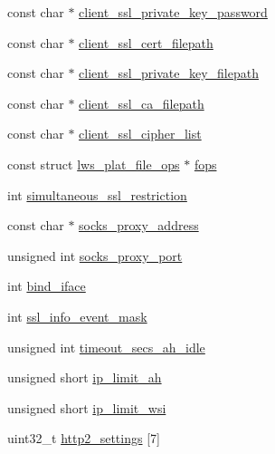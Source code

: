 \begin{DoxyCompactItemize}
\item 
const char $\ast$ \hyperlink{structlws__context__creation__info_a83c709d5dcde2e57b82794b0125208a7}{client\+\_\+ssl\+\_\+private\+\_\+key\+\_\+password}
\item 
const char $\ast$ \hyperlink{structlws__context__creation__info_a3455d3866b9f9f40752ebad440382f50}{client\+\_\+ssl\+\_\+cert\+\_\+filepath}
\item 
const char $\ast$ \hyperlink{structlws__context__creation__info_a7940d8355c16a937d50d271226c3401f}{client\+\_\+ssl\+\_\+private\+\_\+key\+\_\+filepath}
\item 
const char $\ast$ \hyperlink{structlws__context__creation__info_a8e2de485060968e7be1a6f1238d69521}{client\+\_\+ssl\+\_\+ca\+\_\+filepath}
\item 
const char $\ast$ \hyperlink{structlws__context__creation__info_a9302cd766811c49855768c0faf564383}{client\+\_\+ssl\+\_\+cipher\+\_\+list}
\item 
const struct \hyperlink{structlws__plat__file__ops}{lws\+\_\+plat\+\_\+file\+\_\+ops} $\ast$ \hyperlink{structlws__context__creation__info_acf4b535fcf5f638383183e1919969f7c}{fops}
\item 
int \hyperlink{structlws__context__creation__info_a15f4d57af65c2eea7947d518ba8782e2}{simultaneous\+\_\+ssl\+\_\+restriction}
\item 
const char $\ast$ \hyperlink{structlws__context__creation__info_a515032e62576494a69f41971885449cc}{socks\+\_\+proxy\+\_\+address}
\item 
unsigned int \hyperlink{structlws__context__creation__info_ae0f1e3d6c50337d2d93bfbf58c04c934}{socks\+\_\+proxy\+\_\+port}
\item 
int \hyperlink{structlws__context__creation__info_a12b0f0e624463ec02492b009dea7a216}{bind\+\_\+iface}
\item 
int \hyperlink{structlws__context__creation__info_a2d80e89f41b3e195ad36dd1f6fafcb59}{ssl\+\_\+info\+\_\+event\+\_\+mask}
\item 
unsigned int \hyperlink{structlws__context__creation__info_a5400952fc021de4d5c02a5193b1705f1}{timeout\+\_\+secs\+\_\+ah\+\_\+idle}
\item 
unsigned short \hyperlink{structlws__context__creation__info_ac34c403fd540fcf8554be6ca1396905a}{ip\+\_\+limit\+\_\+ah}
\item 
unsigned short \hyperlink{structlws__context__creation__info_ae3336f5097e8206ea21eaa37242c3c41}{ip\+\_\+limit\+\_\+wsi}
\item 
uint32\+\_\+t \hyperlink{structlws__context__creation__info_a763a5795958204e570e8d8a848ad0feb}{http2\+\_\+settings} \mbox{[}7\mbox{]}
\end{DoxyCompactItemize}


